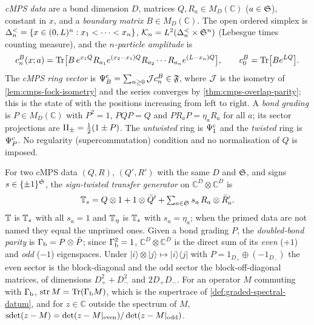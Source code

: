 \begin{definition}
\label{def:cmps-ring-vector}
\emph{cMPS data} are a bond dimension $D$, matrices $Q,R_a\in M_D(\mathbb C)$ ($a\in\mathfrak S$),
constant in $x$, and a \emph{boundary matrix} $B\in M_D(\mathbb C)$. The open ordered simplex
is $\Delta^{<}_{n}=\{x\in(0,L)^n: x_1<\dots<x_n\}$, $\mathcal K_{n}=L^2(\Delta^{<}_{n}\times\mathfrak S^n)$
(Lebesgue times counting measure), and the \emph{$n$-particle amplitude} is
\[
  c^{B}_n(x;a)=\operatorname{Tr}\bigl[B\,e^{x_1Q}R_{a_1}e^{(x_2-x_1)Q}R_{a_2}\cdots R_{a_n}e^{(L-x_n)Q}\bigr],
  \qquad c^{B}_0=\operatorname{Tr}\bigl[Be^{LQ}\bigr].
\]
The \emph{cMPS ring vector} is $\Psi^{\mathrm c}_{B}=\sum_{n\ge0}\mathcal Jc^{B}_n\in\mathfrak F$, where $\mathcal J$ is
the isometry of \cref{lem:cmps-fock-isometry} and the series converges by
\cref{thm:cmps-overlap-parity}; this is the state of \cite{haegeman2013calculus} with the
positions increasing from left to right. A \emph{bond grading} is $P\in M_D(\mathbb C)$ with
$P^2=1$, $PQP=Q$ and $PR_aP=\eta_aR_a$ for all $a$; its sector projections are
$\Pi_{\pm}=\tfrac12(1\pm P)$. The \emph{untwisted} ring is $\Psi^{\mathrm c}_{1}$ and the \emph{twisted}
ring is $\Psi^{\mathrm c}_{P}$. No regularity (supercommutation) condition and no normalisation of $Q$ is
imposed.
\end{definition}

\begin{definition}
\label{def:cmps-transfer-generators}
For two cMPS data $(Q,R)$, $(Q',R')$ with the same $D$ and $\mathfrak S$, and signs
$s\in\{\pm1\}^{\mathfrak S}$, the \emph{sign-twisted transfer generator} on
$\mathbb C^D\otimes\mathbb C^D$ is
\[
  \mathbb T_s=Q\otimes1+1\otimes\bar Q'+\textstyle\sum_{a\in\mathfrak S}s_a\,R_a\otimes\bar R'_a .
\]
$\mathbb T$ is $\mathbb T_s$ with all $s_a=1$ and $\mathbb T_\eta$ is $\mathbb T_s$ with $s_a=\eta_a$; when the
primed data are not named they equal the unprimed ones. Given a bond grading $P$, the
\emph{doubled-bond parity} is $\Gamma_{\mathrm b}=P\otimes\bar P$; since $\Gamma_{\mathrm b}^2=1$, $\mathbb C^D\otimes\mathbb
C^D$ is the direct sum of its \emph{even} ($+1$) and \emph{odd} ($-1$) eigenspaces. Under
$|i\rangle\otimes|j\rangle\mapsto|i\rangle\langle j|$ with $P=1_{D_+}\oplus(-1_{D_-})$ the
even sector is the block-diagonal and the odd sector the block-off-diagonal matrices, of
dimensions $D_+^2+D_-^2$ and $2D_+D_-$. For an operator $M$ commuting with $\Gamma_{\mathrm b}$,
$\operatorname{str} M=\operatorname{Tr}(\Gamma_{\mathrm b} M)$, which is the supertrace of \cref{def:graded-spectral-datum}, and for
$z\in\mathbb C$ outside the spectrum of $M$, $\operatorname{sdet}(z-M)=\det(z-M|_{\mathrm{even}})/
\det(z-M|_{\mathrm{odd}})$.
\end{definition}
